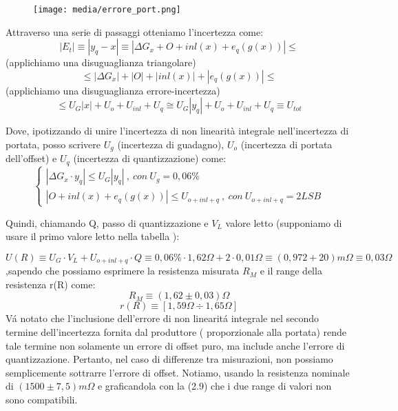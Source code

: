 \begin{figure} [h]
    \centering
    \texttt{[image: media/errore\_port.png]}
    \label{fig:errore port}
\end{figure}

Attraverso una serie di passaggi otteniamo l'incertezza come:
\begin{equation}
    |E_t| \equiv |y_q - x| \equiv | \Delta G_x + O + inl(x) + e_q(g(x)) | \leq 
\end{equation}
(applichiamo una disuguaglianza triangolare)
\begin{equation}
    \leq | \Delta G_x | + | O | + | inl(x) | + | e_q(g(x)) | \leq 
\end{equation}
(applichiamo una disuguaglianza errore-incertezza)
\begin{equation}
    \leq U_G|x| + U_o + U_{inl} + U_q \cong U_G|y_q| + U_o + U_{inl} +U_q \equiv U_{tot}
\end{equation}

Dove, ipotizzando di unire l'incertezza di non linearità integrale nell'incertezza di portata, posso scrivere $U_g$ (incertezza di guadagno), $U_o$ (incertezza di portata dell'offset) e $U_q$ (incertezza di quantizzazione) come: 
\begin{equation}
\left\{\begin{array}{l}
    | \Delta G_x \cdot y_q | \leq U_G |y_q| \ , \ con \ U_g=0,06\% \\
| O + inl(x) + e_q(g(x)) | \leq U_{o+inl+q} \ , \ con \ U_{o+inl+q}=2LSB
\end{array}\right.
\end{equation}

Quindi, chiamando Q, passo di quantizzazione e $V_L$ valore letto (supponiamo di usare il primo valore letto nella tabella \label{mult_port}):

\begin{equation}
    U(R) \equiv U_G \cdot V_L + U_{o+inl+q} \cdot Q \equiv 0,06\% \cdot 1,62\Omega + 2 \cdot 0,01 \Omega \equiv (0,972 + 20) m\Omega \equiv 0,03 \Omega
\end{equation}
,sapendo che possiamo esprimere la resistenza misurata $R_M$ e il range della resistenza r(R) come:
\begin{equation}
    R_M \equiv(1,62 \pm 0,03) \Omega
\end{equation}
\begin{equation}
    r(R) \equiv [1,59 \Omega \div 1,65 \Omega]
\end{equation}
V\'a notato che l'inclusione dell'errore di non linearit\'a integrale nel secondo termine dell'incertezza fornita dal produttore ( proporzionale alla portata) rende tale termine non solamente un errore di offset puro, ma include anche l'errore di quantizzazione. Pertanto, nel caso di differenze tra misurazioni, non possiamo semplicemente sottrarre l'errore di offset.
Notiamo, usando la resistenza nominale di $(1500 \pm 7,5) m\Omega$ e graficandola con la (2.9) che i due range di valori non sono compatibili.

